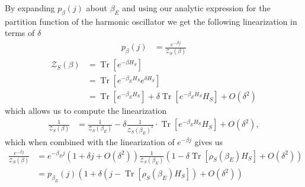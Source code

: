 \documentclass{article}
\newcommand{\parens}[1]{\left( #1 \right)}
\newcommand{\brackets}[1]{\left[ #1 \right]}
\newcommand{\bigo}[1]{O\left( #1 \right)}
\DeclareMathOperator{\Tr}{Tr}
\newcommand{\trace}[1]{\Tr \brackets{ #1 }}
\newcommand{\partfun}{\mathcal{Z}}
\begin{document}
By expanding $p_{\beta}(j)$ about $\beta_E$ and using our analytic expression for the partition function of the harmonic oscillator we get the following linearization in terms of $\delta$
\begin{align}
    p_{\beta}(j) &= \frac{e^{-\beta j}}{\partfun_S(\beta)} 
    \end{align}
\begin{align}
    \partfun_S(\beta) &= \trace{e^{-\beta H_S}} \\
    &= \trace{e^{-\beta_E H_S} e^{\delta H_S}} \\
    &= \trace{e^{-\beta_E H_S}} + \delta \trace{e^{-\beta_E H_S} H_S} + \bigo{\delta^2}
\end{align}
which allows us to compute the linearization
\begin{align}
    \frac{1}{\partfun_S(\beta)} &= \frac{1}{\partfun_S(\beta_E)} - \delta \frac{1}{\partfun_S(\beta_E)^2} \cdot \trace{e^{-\beta_E H_S} H_S} + \bigo{\delta^2},
\end{align}
which when combined with the linearization of $e^{-\beta j}$ gives us
\begin{align}
    \frac{e^{-\beta j}}{\partfun_S(\beta)} &= e^{-\beta_E j} (1 + \delta j + \bigo{\delta^2}) \frac{1}{\partfun_S(\beta_E)} \parens{1 - \delta \trace{\rho_S(\beta_E) H_S} + \bigo{\delta^2}} \\
    &= p_{\beta_E}(j)\parens{1 + \delta(j - \trace{\rho_S(\beta_E) H_S}) + \bigo{\delta^2}}
\end{align}
\end{document}
